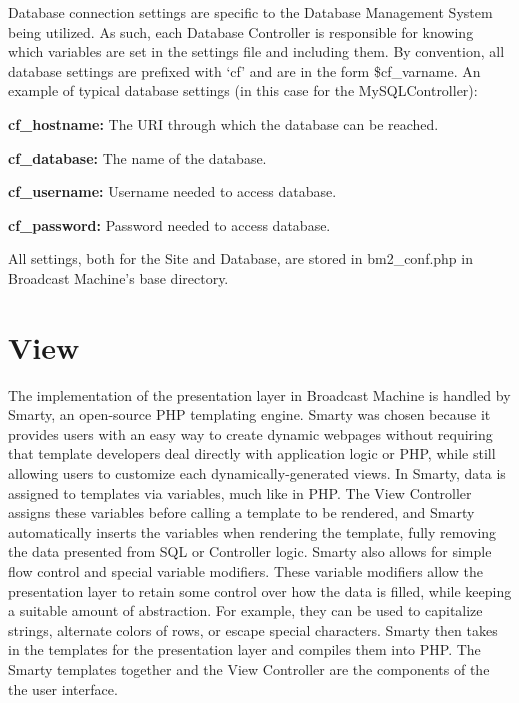 \documentclass[a4paper,12pt]{report}
\newcommand{\scare}[1]{`#1'}
\begin{document}
Database connection settings are specific to the Database Management System being utilized. As such, each Database Controller is responsible for knowing which variables are set in the settings file and including them. By convention, all database settings are prefixed with \scare{cf} and are in the form \$cf\_varname. An example of typical database settings (in this case for the MySQLController): \\

\begin{description}
\item{\textbf{cf\_hostname: } The URI through which the database can be reached.}
\item{\textbf{cf\_database: } The name of the database.}
\item{\textbf{cf\_username: } Username needed to access database.}
\item{\textbf{cf\_password: } Password needed to access database.} \\
\end{description}

All settings, both for the Site and Database, are stored in bm2\_conf.php in Broadcast Machine's base directory.

\section{View}
The implementation of the presentation layer in Broadcast Machine is handled by Smarty, an open-source PHP templating engine. 
Smarty was chosen because it provides users with an easy way to create dynamic webpages without requiring that template developers deal directly with application logic or PHP, while still allowing users to customize each dynamically-generated views. In Smarty, data is assigned to templates via variables, much like in PHP. The View Controller assigns these variables before calling a template to be rendered, and Smarty automatically inserts the variables when rendering the template, fully removing the data presented from SQL or Controller logic.
Smarty also allows for simple flow control and special variable modifiers.
These variable modifiers allow the presentation layer to retain some control over how the data is filled, while keeping a suitable amount of abstraction.
For example, they can be used to capitalize strings, alternate colors of rows, or escape special characters.
Smarty then takes in the templates for the presentation layer and compiles them into PHP. The Smarty templates together and the View Controller are the components of the the user interface.
\end{document}
